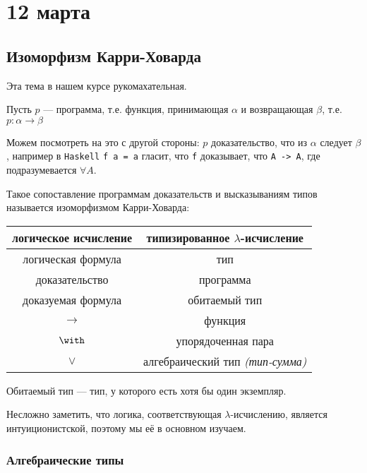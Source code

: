 \chapter{12 марта}

\section{Изоморфизм Карри-Ховарда}

\begin{remark}
    Эта тема в нашем курсе рукомахательная.
\end{remark}

Пусть \(p\) --- программа, т.е. функция, принимающая \(\alpha\) и возвращающая \(\beta\), т.е. \(p : \alpha \to \beta\)

Можем посмотреть на это с другой стороны: \(p\) доказательство, что из \(\alpha\) следует \(\beta\), например в \texttt{Haskell} \texttt{f a = a} гласит, что \texttt{f} доказывает, что \texttt{A -> A}, где подразумевается \(\forall A\).

Такое сопоставление программам доказательств и высказываниям типов называется изоморфизмом Карри-Ховарда:

\begin{tabular}{|c|c|}
    \hline
    логическое исчисление & типизированное \(\lambda\)-исчисление   \\ \hline
    логическая формула    & тип                                     \\
    доказательство        & программа                               \\
    доказуемая формула    & обитаемый тип                           \\
    \( \to \)             & функция                                 \\
    \(\with\)             & упорядоченная пара                      \\
    \(\lor\)              & алгебраический тип \textit{(тип-сумма)} \\
    \hline
\end{tabular}

\begin{remark}
    Обитаемый тип --- тип, у которого есть хотя бы один экземпляр.
\end{remark}

Несложно заметить, что логика, соответствующая \(\lambda\)-исчислению, является интуиционистской, поэтому мы её в основном изучаем.

\subsection{Алгебраические типы}

